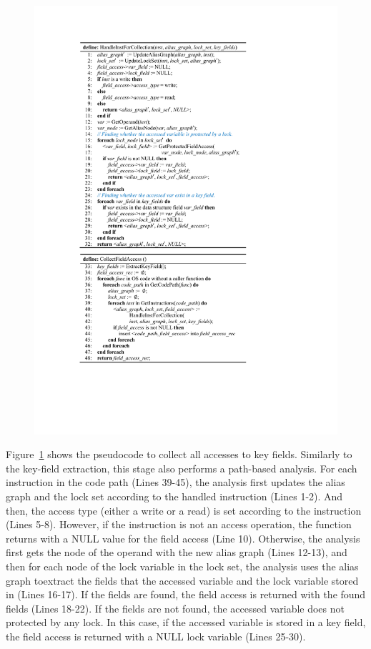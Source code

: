 \begin{figure}[htbp]
	\centering
	\includegraphics[width=1\linewidth]{figures/fig_pseudocode_access_collect.pdf}
	\label{fig_pseudocode_access_collect}
\end{figure}

Figure~\ref{fig_pseudocode_access_collect} shows the pseudocode to collect all 
accesses to key fields. Similarly to the key-field extraction, this stage also 
performs a path-based analysis. For each instruction in the code path (Lines 
39-45), the analysis first updates the alias graph and the lock set according 
to the handled instruction (Lines 1-2). And then, the access type (either a 
write or a read) is set according to the instruction (Lines 5-8). However, if 
the instruction is not an access operation, the function returns with a NULL 
value for the field access (Line 10). Otherwise, the analysis first gets the 
node of the operand with the new alias graph (Lines 12-13), and then for each 
node of the lock variable in the lock set, the analysis uses the alias graph 
toextract the fields that the accessed variable and the lock variable stored in 
(Lines 16-17). If the fields are found, the field access is returned with the 
found fields (Lines 18-22). If the fields are not found, the accessed variable  
does not protected by any lock. In this case, if the accessed variable is 
stored in a key field, the field access is returned with a NULL lock variable 
(Lines 25-30).

